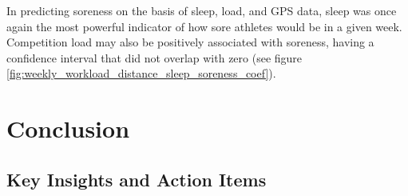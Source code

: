 \documentclass{article}
\begin{document}
			In predicting soreness on the basis of sleep, load, and GPS data, sleep
			was once again the most powerful indicator of how sore athletes would be
			in a given week. Competition load may also be positively associated
			with soreness, having a confidence interval that did not overlap with zero
			(see figure \ref{fig:weekly_workload_distance_sleep_soreness_coef}).



	\section{Conclusion}
	
		\subsection{Key Insights and Action Items}
\end{document}
